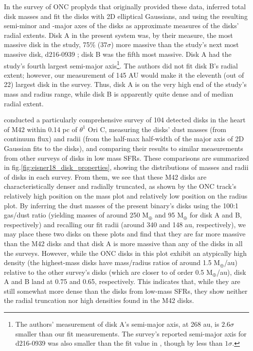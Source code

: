 In the survey of ONC proplyds that originally provided these data, \citet{Mann2014} inferred total disk masses and fit the disks with 2D elliptical Gaussians, and using the resulting semi-minor and -major axes of the disks as approximate measures of the disks' radial extents. Disk A in the present system was, by their measure, the most massive disk in the study, 75\% ($37\sigma$) more massive than the study's next most massive disk, d216-0939 \citet[which was the subject of][]{Factor2017} ; disk B was the fifth most massive. Disk A had the study's fourth largest semi-major axis\footnote{The authors' measurement of disk A's semi-major axis, at 268 au, is $2.6\sigma$ smaller than our fit measurements. The survey's reported semi-major axis for d216-0939 was also smaller than the fit value in \citet{Factor2017}, though by less than $1\sigma$.}. The authors did not fit disk B's radial extent; however, our measurement of 145 AU would make it the eleventh (out of 22) largest disk in the survey. Thus, disk A is on the very high end of the study's mass and radius range, while disk B is apparently quite dense and of median radial extent.




\citet{Eisner2018} conducted a particularly comprehensive survey of 104 detected disks in the heart of M42 within 0.14 pc of $\theta^1$ Ori C, measuring the disks' dust masses (from continuum flux) and radii (from the half-max half-width of the major axis of 2D Gaussian fits to the disks), and comparing their results to similar measurements from other surveys of disks in low mass SFRs. These comparisons are summarized in fig.\ref{fig:eisner18_disk_properties}, showing the distributions of masses and radii of disks in each survey. From them, we see that these M42 disks are characteristically denser and radially truncated, as shown by the ONC track's relatively high position on the mass plot and relatively low position on the radius plot. By inferring the dust masses of the present binary's disks using the 100:1 gas/dust ratio (yielding masses of around 250 M$_\oplus$ and 95 M$_\oplus$ for disk A and B, respectively) and recalling our fit radii (around 340 and 148 au, respectively), we may place these two disks on these plots and find that they are far more massive than the M42 disks and that disk A is more massive than any of the disks in all the surveys. However, while the ONC disks in this plot exhibit an atypically high density (the highest-mass disks have mass/radius ratios of around 1.5 M$_\oplus$/au) relative to the other survey's disks (which are closer to of order 0.5 M$_\oplus$/au), disk A and B land at 0.75 and 0.65, respectively. This indicates that, while they are still somewhat more dense than the disks from low-mass SFRs, they show neither the radial truncation nor high densities found in the M42 disks.



